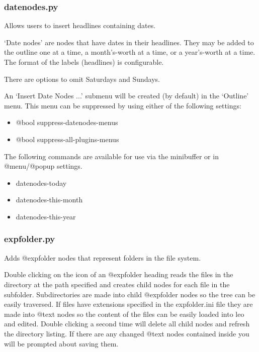 \documentclass[a4paper,10pt,english]{sphinxmanual}
\begin{document}
\subsubsection{datenodes.py}
\label{plugins:datenodes-py}
Allows users to insert headlines containing dates.

`Date nodes' are nodes that have dates in their headlines. They may be added to
the outline one at a time, a month's-worth at a time, or a year's-worth at a
time. The format of the labels (headlines) is configurable.

There are options to omit Saturdays and Sundays.

An `Insert Date Nodes ...' submenu will be created (by default) in the `Outline'
menu.  This menu can be suppressed by using either of the following settings:
\begin{itemize}
\item {} 
@bool suppress-datenodes-menus

\item {} 
@bool suppress-all-plugins-menus

\end{itemize}

The following commands are available for use via the minibuffer or in
@menu/@popup settings.
\begin{itemize}
\item {} 
datenodes-today

\item {} 
datenodes-this-month

\item {} 
datenodes-this-year

\end{itemize}


\subsubsection{expfolder.py}
\label{plugins:expfolder-py}
Adds @expfolder nodes that represent folders in the file system.

Double clicking on the icon of an @expfolder heading reads the files in the
directory at the path specified and creates child nodes for each file in the
subfolder. Subdirectories are made into child @expfolder nodes so the tree can
be easily traversed. If files have extensions specified in the expfolder.ini
file they are made into @text nodes so the content of the files can be easily
loaded into leo and edited. Double clicking a second time will delete all child
nodes and refresh the directory listing. If there are any changed @text nodes
contained inside you will be prompted about saving them.
\end{document}
